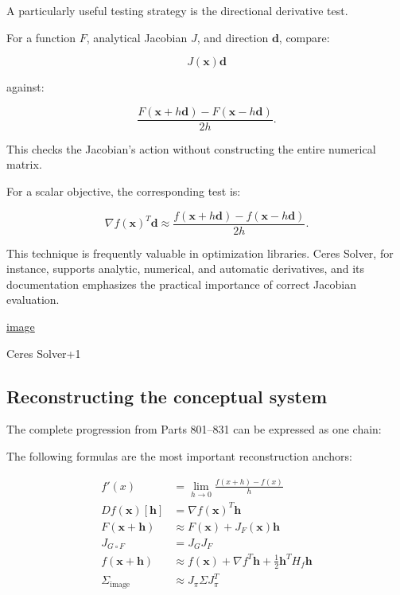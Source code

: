 A particularly useful testing strategy is the directional derivative test.

For a function \(F\), analytical Jacobian \(J\), and direction \(\mathbf d\), compare:

\[
J(\mathbf x)\mathbf d
\]

against:

\[
\frac{ F(\mathbf x+h\mathbf d) - F(\mathbf x-h\mathbf d) }{2h}.
\]

This checks the Jacobian's action without constructing the entire numerical matrix.

For a scalar objective, the corresponding test is:

\[
\nabla f(\mathbf x)^T\mathbf d \approx \frac{ f(\mathbf x+h\mathbf d) - f(\mathbf x-h\mathbf d) }{2h}.
\]

This technique is frequently valuable in optimization libraries. Ceres Solver, for instance, supports analytic, numerical, and automatic derivatives, and its documentation emphasizes the practical importance of correct Jacobian evaluation. 

\href{https://www.google.com/s2/favicons?domain=https://ceres-solver.readthedocs.io&sz=32}{image}

Ceres Solver+1

\subsection{Reconstructing the conceptual system}\label{02-foundations-ii-ch021-reconstructing-the-conceptual-system}

\hypertarget{02-foundations-ii-ch021-reconstructing-the-conceptual-system}{}

The complete progression from Parts 801--831 can be expressed as one chain:

The following formulas are the most important reconstruction anchors:

\[
\boxed{ \begin{aligned} f'(x)&=\lim_{h\to0}\frac{f(x+h)-f(x)}h\\[3pt] Df(\mathbf x)[\mathbf h]&=\nabla f(\mathbf x)^T\mathbf h\\[3pt] F(\mathbf x+\mathbf h)&\approx F(\mathbf x)+J_F(\mathbf x)\mathbf h\\[3pt] J_{G\circ F}&=J_GJ_F\\[3pt] f(\mathbf x+\mathbf h)&\approx f(\mathbf x)+\nabla f^T\mathbf h+ \frac12\mathbf h^TH_f\mathbf h\\[3pt] \Sigma_{\text{image}}&\approx J_\pi\Sigma J_\pi^T \end{aligned} }
\]

